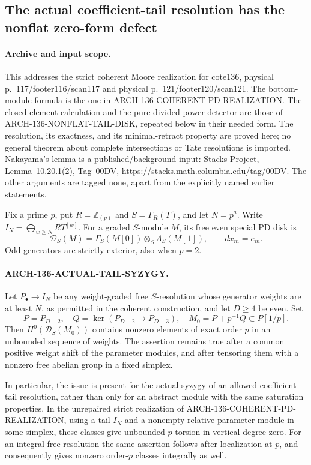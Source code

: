 \subsection{The actual coefficient-tail resolution has the nonflat zero-form defect}
\label{arch136:actual-tail-syzygy}

\paragraph{Archive and input scope.}
This addresses the strict coherent Moore realization for cote136,
physical p.~117/footer116/scan117 and physical p.~121/footer120/scan121.
The bottom-module formula is the one in
ARCH-136-COHERENT-PD-REALIZATION. The closed-element calculation and
the pure divided-power detector are those of
ARCH-136-NONFLAT-TAIL-DISK, repeated below in their needed form.
The resolution, its exactness, and its minimal-retract property
are proved here; no general theorem about complete intersections
or Tate resolutions is imported. Nakayama's lemma is a
published/background input: Stacks Project, Lemma~10.20.1(2),
Tag~00DV, \url{https://stacks.math.columbia.edu/tag/00DV}.
The other arguments are tagged none, apart from the explicitly
named earlier statements.

Fix a prime \(p\), put \(R=\mathbb Z_{(p)}\) and
\(S=\Gamma_R(T)\), and let \(N=p^a\). Write
\(I_N=\bigoplus_{w\geq N}R T^{[w]}\).
For a graded \(S\)-module \(M\), its free even special PD disk is
\[
 \mathscr D_S(M)=\Gamma_S(M[0])\otimes_S\Lambda_S(M[1]),
 \qquad d x_m=e_m.                                      \tag{AT.1}
\]
Odd generators are strictly exterior, also when \(p=2\).

\paragraph{ARCH-136-ACTUAL-TAIL-SYZYGY.}
Let \(P_\bullet\to I_N\) be any weight-graded free
\(S\)-resolution whose generator weights are at least \(N\),
as permitted in the coherent construction, and let \(D\geq4\) be even. Set
\[
 P=P_{D-2},\quad Q=\ker(P_{D-2}\to P_{D-3}),\quad
 M_0=P+p^{-1}Q\subset P[1/p].                            \tag{AT.2}
\]
Then \(H^0(\mathscr D_S(M_0))\) contains nonzero elements
of exact order \(p\) in an unbounded sequence of weights.
The assertion remains true after a common positive weight shift
of the parameter modules, and after tensoring them with a
nonzero free abelian group in a fixed simplex.

In particular, the issue is present for the actual syzygy of an
allowed coefficient-tail resolution, rather than only for an
abstract module with the same saturation properties. In the
unrepaired strict realization of
ARCH-136-COHERENT-PD-REALIZATION, using a tail \(I_N\) and a
nonempty relative parameter module in some simplex, these
classes give unbounded \(p\)-torsion in vertical degree zero.
For an integral free resolution the same assertion follows
after localization at \(p\), and consequently gives nonzero
order-\(p\) classes integrally as well.

